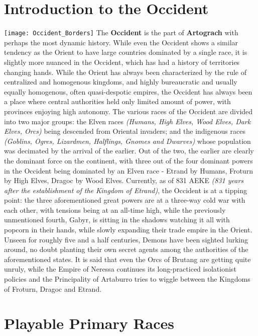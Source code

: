 \documentclass[openany,10pt,a4paper]{book}
\begin{document}
\chapter{Introduction to the Occident}
\texttt{[image: Occident\_Borders]}
\newpage
The \textbf{Occident} is the part of \textbf{Artograch} with perhaps the most dynamic history. While even the Occident shows a similar tendency as the Orient to have large countries dominated by a single race, it is slightly more nuanced in the Occident, which has had a history of territories changing hands. While the Orient has always been characterized by the rule of centralized and homogenous kingdoms, and highly bureaucratic and usually equally homogenous, often quasi-despotic empires, the Occident has always been a place where central authorities held only limited amount of power, with provinces enjoying high autonomy.\newline
The various races of the Occident are divided into two major groups: the Elven races \textit{(Humans, High Elves, Wood Elves, Dark Elves, Orcs)} being descended from Oriental invaders; and the indigenous races \textit{(Goblins, Ogres, Lizardmen, Halflings, Gnomes and Dwarves)} whose population was decimated by the arrival of the earlier. Out of the two, the earlier are clearly the dominant force on the continent, with three out of the four dominant powers in the Occident being dominated by an Elven race - Etrand by Humans, Froturn by High Elves, Dragoc by Wood Elves.\newline
Currently, as of 831 AEKE \textit{(831 years after the establishment of the Kingdom of Etrand)}, the Occident is at a tipping point: the three aforementioned great powers are at a three-way cold war with each other, with tensions being at an all-time high, while the previously unmentioned fourth, Gabyr, is sitting in the shadows watching it all with popcorn in their hands, while slowly expanding their trade empire in the Orient. Unseen for roughly five and a half centuries, Demons have been sighted lurking around, no doubt planting their own secret agents among the authorities of the aforementioned states. It is said that even the Orcs of Brutang are getting quite unruly, while the Empire of Neressa continues its long-practiced isolationist policies and the Principality of Artaburro tries to wiggle between the Kingdoms of Froturn, Dragoc and Etrand.
\chapter{Playable Primary Races}
\end{document}
